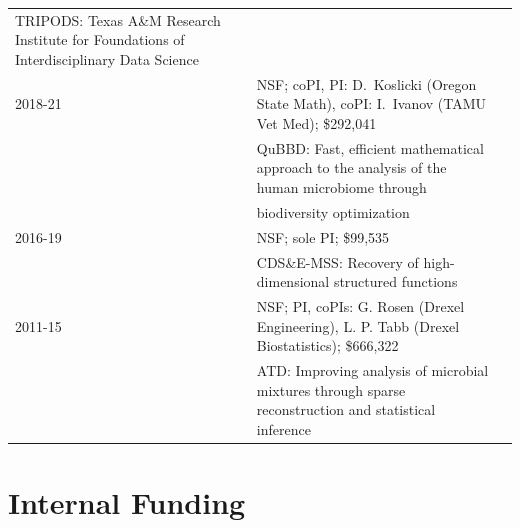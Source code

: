\documentclass[11pt]{article}
\begin{document}
\begin{tabular}{lll}
{\small TRIPODS:} Texas A\&M Research Institute for Foundations of Interdisciplinary Data Science\\
2018-21 & NSF; coPI, PI: D.~Koslicki (Oregon State Math), coPI: I.~Ivanov (TAMU Vet Med); 
\$292,041 \\
& \hspace{-15mm}
{\small QuBBD:} Fast, efficient mathematical approach to the analysis of the
human microbiome through\\ 
& \hspace{-15mm} biodiversity optimization\\
2016-19 & NSF; sole PI;
\$99,535 
\\
& \hspace{-15mm}
{\small CDS\&E-MSS:} Recovery of high-dimensional structured functions
\\
2011-15 & NSF; PI, coPIs: G. Rosen (Drexel Engineering), L. P. Tabb (Drexel Biostatistics); 
\$666,322\\
& \hspace{-15mm}
{\small ATD:} Improving analysis of microbial mixtures through sparse
reconstruction and statistical inference
\end{tabular}

\section{Internal Funding}
\end{document}
